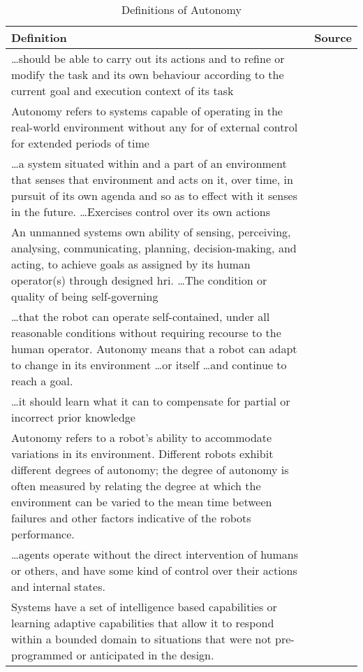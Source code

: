 \begin{table}\centering
  \caption{Definitions of Autonomy}
  \label{tab:autonomy_definitions}
  \begin{tabularx}{\textwidth}{X p{3cm}}\toprule
    Definition & Source \\ \midrule
    \ldots should be able to carry out its actions and to refine or modify the task and its own behaviour according to the current goal and execution context of its task &~\citet{Alami1998}\\
    Autonomy refers to systems capable of operating in the real-world environment without any for of external control for extended periods of time &~\citet{Bekey2005}\\
    \ldots a system situated within and a part of an environment that senses that environment and acts on it, over time, in pursuit of its own agenda and so as to effect with it senses in the future. \ldots Exercises control over its own actions &~\citet{Franklin1997} \\
    An unmanned systems own ability of sensing, perceiving, analysing, communicating, planning, decision-making, and acting, to achieve goals as assigned by its human operator(s) through designed \gls{hri}. \ldots The condition or quality of being self-governing &~\citet{Huang2004}\\
    \ldots that the robot can operate self-contained, under all reasonable conditions without requiring recourse to the human operator. Autonomy means that a robot can adapt to change in its environment \ldots or itself \ldots and continue to reach a goal. &~\citet{Murphy2000}\\
    \ldots it should learn what it can to compensate for partial or incorrect prior knowledge &~\citet{Russell2009} \\
    Autonomy refers to a robot's ability to accommodate variations in its environment. Different robots exhibit different degrees of autonomy; the degree of autonomy is often measured by relating the degree at which the environment can be varied to the mean time between failures and other factors indicative of the robots performance. &~\citet{Thrun2004}\\
    \ldots agents operate without the direct intervention of humans or others, and have some kind of control over their actions and internal states. &~\citet{Wooldridge1995}\\
    Systems have a set of intelligence based capabilities or learning adaptive capabilities that allow it to respond within a bounded domain to situations that were not pre-programmed or anticipated in the design. &~\citet{Fox2014}\\\bottomrule
  \end{tabularx}
\end{table}

